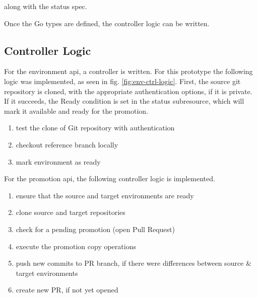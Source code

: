 

along with the status spec.



Once the Go types are defined,
the controller logic can be written.

\subsection{Controller Logic}

For the environment api,
a controller is written.
For this prototype the following logic was implemented,
as seen in fig. \ref{fig:env-ctrl-logic}.
First, the source git repository is cloned,
with the appropriate authentication options, if it is private.
If it succeeds, the Ready condition is set in the status subresource,
which will mark it available and ready for the promotion.

\begin{enumerate}
	\item test the clone of Git repository with authentication
	\item checkout reference branch locally
	\item mark environment as ready
\end{enumerate}

For the promotion api,
the following controller logic is implemented.

\begin{enumerate}
	\item ensure that the source and target environments are ready
	\item clone source and target repositories
	\item check for a pending promotion (open Pull Request)
	\item execute the promotion copy operations
	\item push new commits to PR branch, if there were differences between source \& target environments
	\item create new PR, if not yet opened
\end{enumerate}


















